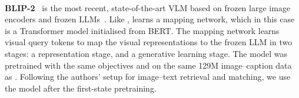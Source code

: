 \paragraph{}
\noindent\textbf{BLIP-2}~\cite{blip2} is the most recent, state-of-the-art VLM based on frozen large image encoders and frozen LLMs~\citep{opt,flan_t5}.
Like \clipcap, \bliptwo learns a mapping network, which in this case is a Transformer model initialised from BERT.
The mapping network learns visual query tokens to map the visual representations to the frozen LLM in two stages: a \vl representation stage, and a generative learning stage.
The model was pretrained with the same objectives and on the same 129M image--caption data as \blip.
Following the authors' setup for image--text retrieval and matching, we use the \bliptwo model after the first-state pretraining.

